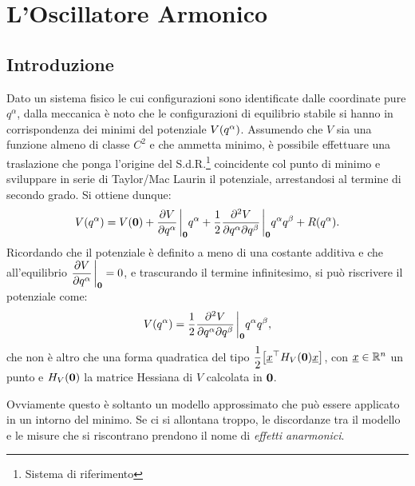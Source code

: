 \chapter{L'Oscillatore Armonico}
    \section{Introduzione}
    Dato un sistema fisico le cui configurazioni sono identificate dalle coordinate pure $q^\alpha$, dalla meccanica \`e noto che le configurazioni di equilibrio stabile si hanno in corrispondenza dei minimi del potenziale $V\qty(q^\alpha)$. Assumendo che $V$ sia una funzione almeno di classe $C^2$ e che ammetta minimo, \`e possibile effettuare una traslazione che ponga l'origine del S.d.R.\footnote{Sistema di riferimento} coincidente col punto di minimo e sviluppare in serie di Taylor/Mac Laurin il potenziale, arrestandosi al termine di secondo grado. Si ottiene dunque: $$V\qty(q^\alpha)=V\qty(\vb{0})+\pdv{V}{q^\alpha}\eval_{\vb{0}}q^\alpha+\frac{1}{2}\pdv{V}{q^\alpha}{q^\beta}\eval_{\vb{0}}q^\alpha q^\beta+R\qty(q^\alpha).$$ Ricordando che il potenziale \`e definito a meno di una costante additiva e che all'equilibrio $\displaystyle\pdv{V}{q^\alpha}\eval_{\vb{0}}=0$, e trascurando il termine infinitesimo, si pu\`o riscrivere il potenziale come\cite{Goldstein2005-jd}:
    \begin{equation}
        V\qty(q^\alpha)=\frac{1}{2}\pdv{V}{q^\alpha}{q^\beta}\eval_{\vb{0}}q^\alpha q^\beta,
        \label{eq:potenziale:1}
    \end{equation} che non \`e altro che una forma quadratica del tipo $\displaystyle\frac{1}{2}\qty[\underline{x}^\top H_V\qty(\vb{0})\underline{x}]$, con $\underline{x}\in\mathbb{R}^n$ un punto e $H_V\qty(\vb{0})$ la matrice Hessiana di $V$ calcolata in $\vb{0}$. \par Ovviamente questo \`e soltanto un modello approssimato che pu\`o essere applicato in un intorno del minimo. Se ci si allontana troppo, le discordanze tra il modello e le misure che si riscontrano prendono il nome di \emph{effetti anarmonici}.
